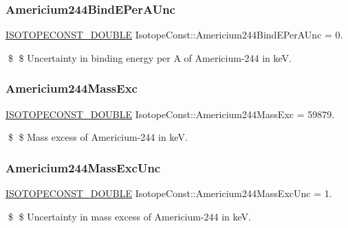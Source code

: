 \subsubsection{\texorpdfstring{Americium244\+Bind\+E\+Per\+A\+Unc}{Americium244BindEPerAUnc}}
{\footnotesize\ttfamily \mbox{\hyperlink{group___isotope_const-_macros_ga8f45a7272ce02c0b4c65c44636ed719a}{I\+S\+O\+T\+O\+P\+E\+C\+O\+N\+S\+T\+\_\+\+D\+O\+U\+B\+LE}} Isotope\+Const\+::\+Americium244\+Bind\+E\+Per\+A\+Unc = 0.}

\$ \$ Uncertainty in binding energy per A of Americium-\/244 in keV. \mbox{\label{group___isotope_const-_americium-_am244_gaa420a33ae9cdf60e59450751188f9a4b}} 
\subsubsection{\texorpdfstring{Americium244\+Mass\+Exc}{Americium244MassExc}}
{\footnotesize\ttfamily \mbox{\hyperlink{group___isotope_const-_macros_ga8f45a7272ce02c0b4c65c44636ed719a}{I\+S\+O\+T\+O\+P\+E\+C\+O\+N\+S\+T\+\_\+\+D\+O\+U\+B\+LE}} Isotope\+Const\+::\+Americium244\+Mass\+Exc = 59879.}

\$ \$ Mass excess of Americium-\/244 in keV. \mbox{\label{group___isotope_const-_americium-_am244_ga042bdcbba4dcb0cfd633729357e1859d}} 
\subsubsection{\texorpdfstring{Americium244\+Mass\+Exc\+Unc}{Americium244MassExcUnc}}
{\footnotesize\ttfamily \mbox{\hyperlink{group___isotope_const-_macros_ga8f45a7272ce02c0b4c65c44636ed719a}{I\+S\+O\+T\+O\+P\+E\+C\+O\+N\+S\+T\+\_\+\+D\+O\+U\+B\+LE}} Isotope\+Const\+::\+Americium244\+Mass\+Exc\+Unc = 1.}

\$ \$ Uncertainty in mass excess of Americium-\/244 in keV. \mbox{\label{group___isotope_const-_americium-_am244_ga4ffbd15c45ef9d6ca7e499085e2ac41c}} 
